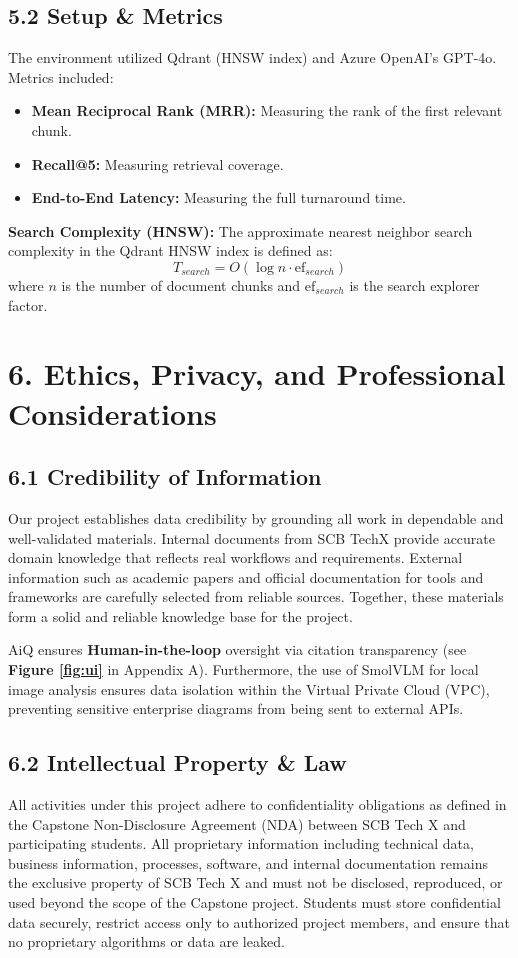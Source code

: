 \documentclass[12pt]{article}
\begin{document}
\subsection{5.2 Setup \& Metrics}
The environment utilized Qdrant (HNSW index) and Azure OpenAI's GPT-4o. Metrics included:
\begin{itemize}
    \item \textbf{Mean Reciprocal Rank (MRR):} Measuring the rank of the first relevant chunk.
    \item \textbf{Recall@5:} Measuring retrieval coverage.
    \item \textbf{End-to-End Latency:} Measuring the full turnaround time.
\end{itemize}

\textbf{Search Complexity (HNSW):}
The approximate nearest neighbor search complexity in the Qdrant HNSW index is defined as:
\begin{equation}
T_{search} = O(\log n \cdot \text{ef}_{search})
\end{equation}
where $n$ is the number of document chunks and $\text{ef}_{search}$ is the search explorer factor.
\newpage
\section{6. Ethics, Privacy, and Professional Considerations}

\subsection{6.1 Credibility of Information}
Our project establishes data credibility by grounding all work in dependable and well-validated materials. Internal documents from SCB TechX provide accurate domain knowledge that reflects real workflows and requirements. External information such as academic papers and official documentation for tools and frameworks are carefully selected from reliable sources. Together, these materials form a solid and reliable knowledge base for the project.

AiQ ensures \textbf{Human-in-the-loop} oversight via citation transparency (see \textbf{Figure \ref{fig:ui}} in Appendix A). Furthermore, the use of SmolVLM for local image analysis ensures data isolation within the Virtual Private Cloud (VPC), preventing sensitive enterprise diagrams from being sent to external APIs.

\subsection{6.2 Intellectual Property \& Law}
All activities under this project adhere to confidentiality obligations as defined in the Capstone Non-Disclosure Agreement (NDA) between SCB Tech X and participating students. All proprietary information including technical data, business information, processes, software, and internal documentation remains the exclusive property of SCB Tech X and must not be disclosed, reproduced, or used beyond the scope of the Capstone project. Students must store confidential data securely, restrict access only to authorized project members, and ensure that no proprietary algorithms or data are leaked.
\end{document}
